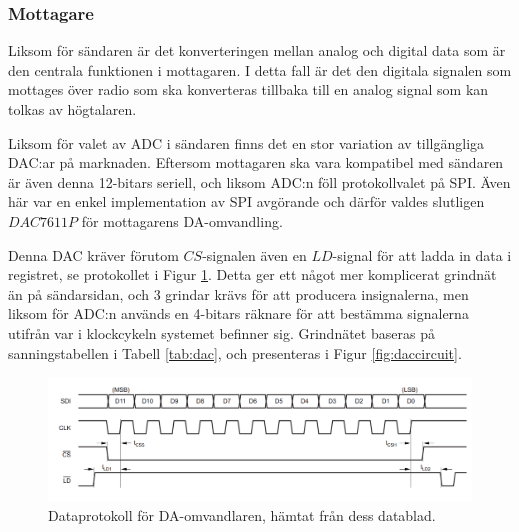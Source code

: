 \documentclass[a4paper,10pt]{article}
\begin{document}
\subsubsection{Mottagare}

Liksom för sändaren är det konverteringen mellan analog och digital data som
är den centrala funktionen i mottagaren. I detta fall är det den digitala 
signalen som mottages över radio som ska konverteras tillbaka till en analog
signal som kan tolkas av högtalaren.

Liksom för valet av ADC i sändaren finns det en stor variation av tillgängliga 
DAC:ar på marknaden. Eftersom mottagaren ska vara kompatibel med sändaren
är även denna 12-bitars seriell, och liksom ADC:n föll protokollvalet på SPI. 
Även här var en enkel implementation av SPI avgörande och därför valdes 
slutligen $DAC7611P$ \cite{dac} för mottagarens DA-omvandling. 

Denna DAC kräver förutom $CS$-signalen även en $LD$-signal för att ladda in data
i registret, se protokollet i Figur \ref{fig:dacprotocol}. Detta ger ett något 
mer komplicerat grindnät än på sändarsidan, och 3 grindar krävs för att 
producera insignalerna, men liksom för ADC:n används en 4-bitars räknare för att
bestämma signalerna utifrån var i klockcykeln systemet befinner sig. Grindnätet 
baseras på sanningstabellen i Tabell \ref{tab:dac}, och presenteras i Figur 
\ref{fig:daccircuit}.

\begin{figure}[h]
\centering
\includegraphics[width=\textwidth]{dacdiagram.png}
\caption{Dataprotokoll för DA-omvandlaren, hämtat från dess datablad.}
\label{fig:dacprotocol}
\end{figure}
\end{document}
